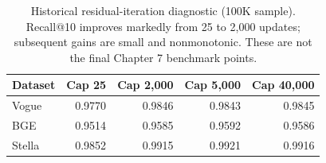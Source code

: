 \begin{table}[tbp]
\centering
\caption[Residual-iteration diagnostic]{Historical residual-iteration diagnostic (100K sample). Recall@10
improves markedly from 25 to 2,000 updates; subsequent gains are small and
nonmonotonic. These are not the final Chapter 7 benchmark points.}
\label{tab:4-lloyd}
\small
\begin{tabular}{@{}lrrrr@{}}
\toprule
Dataset & Cap 25 & Cap 2,000 & Cap 5,000 & Cap 40,000 \\
\midrule
Vogue & 0.9770 & 0.9846 & 0.9843 & 0.9845 \\
BGE & 0.9514 & 0.9585 & 0.9592 & 0.9586 \\
Stella & 0.9852 & 0.9915 & 0.9921 & 0.9916 \\
\bottomrule
\end{tabular}
\end{table}
